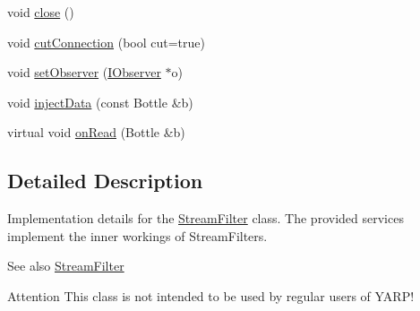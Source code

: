 \begin{DoxyCompactItemize}
\item 
void \hyperlink{classyarp_1_1os_1_1impl_1_1_stream_filter_impl_ad7161adcaae840c0f88c7d24312b774f}{close} ()
\item 
void \hyperlink{classyarp_1_1os_1_1impl_1_1_stream_filter_impl_a48096e050f252e896ad831a12da0c6b3}{cutConnection} (bool cut=true)
\item 
void \hyperlink{classyarp_1_1os_1_1impl_1_1_stream_filter_impl_aa3486d2806b76cf08b4594a1a0b367d7}{setObserver} (\hyperlink{classyarp_1_1os_1_1_i_observer}{IObserver} $\ast$o)
\item 
void \hyperlink{classyarp_1_1os_1_1impl_1_1_stream_filter_impl_af1701f0821906931c9271e9561988784}{injectData} (const Bottle \&b)
\item 
virtual void \hyperlink{classyarp_1_1os_1_1impl_1_1_stream_filter_impl_a6124d272f1dedaf326deef524e23a2f9}{onRead} (Bottle \&b)
\end{DoxyCompactItemize}


\subsection{Detailed Description}
Implementation details for the {\ttfamily \hyperlink{classyarp_1_1os_1_1_stream_filter}{StreamFilter}} class. The provided services implement the inner workings of StreamFilters.

\begin{DoxySeeAlso}{See also}
\hyperlink{classyarp_1_1os_1_1_stream_filter}{StreamFilter}
\end{DoxySeeAlso}
\begin{DoxyAttention}{Attention}
This class is not intended to be used by regular users of YARP! 
\end{DoxyAttention}


